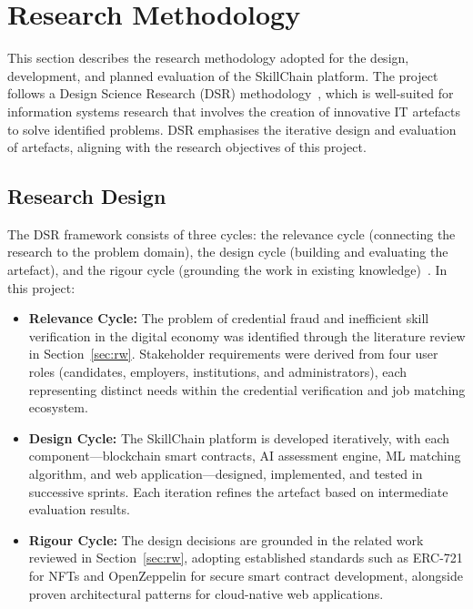 
\section{Research Methodology}
\label{sec:Methodology}

This section describes the research methodology adopted for the design, development, and planned evaluation of the SkillChain platform. The project follows a Design Science Research (DSR) methodology~\citep{Hevner2004}, which is well-suited for information systems research that involves the creation of innovative IT artefacts to solve identified problems. DSR emphasises the iterative design and evaluation of artefacts, aligning with the research objectives of this project.

\subsection{Research Design}
\label{sec:ResearchDesign}

The DSR framework consists of three cycles: the relevance cycle (connecting the research to the problem domain), the design cycle (building and evaluating the artefact), and the rigour cycle (grounding the work in existing knowledge)~\citep{Hevner2004}. In this project:

\begin{itemize}
    \item \textbf{Relevance Cycle:} The problem of credential fraud and inefficient skill verification in the digital economy was identified through the literature review in Section~\ref{sec:rw}. Stakeholder requirements were derived from four user roles (candidates, employers, institutions, and administrators), each representing distinct needs within the credential verification and job matching ecosystem.
    \item \textbf{Design Cycle:} The SkillChain platform is developed iteratively, with each component---blockchain smart contracts, AI assessment engine, ML matching algorithm, and web application---designed, implemented, and tested in successive sprints. Each iteration refines the artefact based on intermediate evaluation results.
    \item \textbf{Rigour Cycle:} The design decisions are grounded in the related work reviewed in Section~\ref{sec:rw}, adopting established standards such as ERC-721 for NFTs and OpenZeppelin for secure smart contract development, alongside proven architectural patterns for cloud-native web applications.
\end{itemize}

